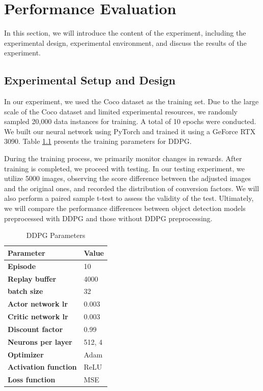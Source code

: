 \documentclass{PHlab-thesis}
\begin{document}
\chapter{Performance Evaluation}
In this section, we will introduce the content of the experiment, including the experimental design, experimental environment, and discuss the results of the experiment.

\section{Experimental Setup and Design}
In our experiment, we used the Coco dataset \cite{lin2014microsoft} as the training set. Due to the large scale of the Coco dataset and limited experimental resources, we randomly sampled 20,000 data instances for training. A total of 10 epochs were conducted. We built our neural network using PyTorch and trained it using a GeForce RTX 3090. Table \ref{Fig.DDPG parameter} presents the training parameters for DDPG.

During the training process, we primarily monitor changes in rewards. After training is completed, we proceed with testing. In our testing experiment, we utilize 5000 images, observing the score difference between the adjusted images and the original ones, and recorded the distribution of conversion factors. We will also perform a paired sample t-test to assess the validity of the test. Ultimately, we will compare the performance differences between object detection models preprocessed with DDPG and those without DDPG preprocessing.

\begin{table}[H]
	\centering
	\caption{DDPG Parameters}
        \label{Fig.DDPG parameter} 
	\begin{tabular}{p{5cm}p{5cm}}
		\toprule  %
		\textbf{Parameter}   &\textbf{Value}  \\
		\midrule  %
		\textbf{Episode}    & 10 \\
		\textbf{Replay buffer} & 4000   \\
		\textbf{batch size} & 32  \\
		\textbf{Actor network lr} & 0.003  \\
		\textbf{Critic network lr}   & 0.003 \\
		\textbf{Discount factor}   & 0.99 \\
		\textbf{Neurons per layer}   & 512, 4 \\
		\textbf{Optimizer}   & Adam \\
		\textbf{Activation function}   & ReLU \\
		\textbf{Loss function}   & MSE \\
		\bottomrule %
	\end{tabular}
\end{table} 
\end{document}
